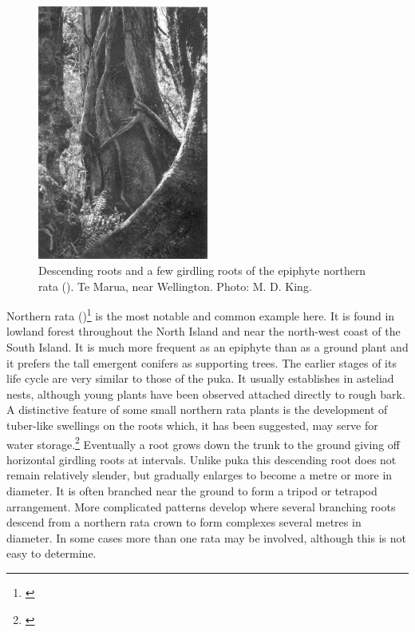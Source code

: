 \begin{figure}
	\includegraphics[width=0.5\textwidth]{graphics/figure50rata.jpg}
	\centering
	\caption[Descending roots and a few girdling roots of the epiphyte northern rata]{Descending roots and a few girdling roots of the epiphyte northern rata ().
Te Marua, near Wellington.
	Photo: M. D. King.}
	\label{fig:50rata}
\end{figure}

Northern rata ()\footnote{\cite{dawson1967growth}} is the most notable and common example here.
It is found in lowland forest throughout the North Island and near the north-west coast of the South Island.
It is much more frequent as an epiphyte than as a ground plant and it prefers the tall emergent conifers as supporting trees.
The earlier stages of its life cycle are very similar to those of the puka.
It usually establishes in asteliad nests, although young plants have been observed attached directly to rough bark.
A distinctive feature of some small northern rata plants is the development of tuber-like swellings on the roots which, it has been suggested, may serve for water storage.\footnote{\cite{beddie1953root}}
Eventually a root grows down the trunk to the ground giving off horizontal girdling roots at intervals.
Unlike puka this descending root does not remain relatively slender, but gradually enlarges to become a metre or more in diameter.
It is often branched near the ground to form a tripod or tetrapod arrangement.
More complicated patterns develop where several branching roots descend from a northern rata crown to form complexes several metres in diameter.
In some cases more than one rata may be involved, although this is not easy to determine.

